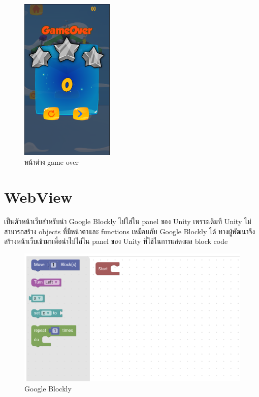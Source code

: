 \begin{figure}[h!]
\begin{center}
\includegraphics[width=1.75in]{pic/GameOver1.png}
\end{center}
\caption{หน้าต่าง game over}
\label{lose}
\end{figure}

\clearpage

\section{WebView}
เป็นตัวหน้าเว็บสำหรับนำ Google Blockly ไปใส่ใน panel ของ Unity เพราะเดิมที Unity ไม่สามารถสร้าง objects ที่มีหน้าตาและ functions เหมือนกับ Google Blockly ได้ ทางผู้พัฒนาจึงสร้างหน้าเว็บเข้ามาเพื่อนำไปใส่ใน 
panel ของ Unity ที่ใช้ในการแสดงผล block code

\begin{figure}[h!]
\begin{center}
\includegraphics{pic/CodePanel.png}
\end{center}
\caption[Google Blockly]{Google Blockly}
\label{block}
\end{figure}


